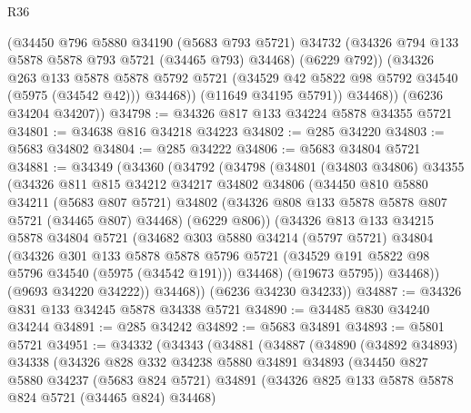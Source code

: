 \begin{lexlean}{R36}
\begin{coremodule}
              (@34450
                @796
                @5880
                @34190
                (@5683 @793 @5721)
                @34732
                (@34326 @794 @133 @5878 @5878 @793 @5721 (@34465 @793) @34468)
                (@6229 @792))
              (@34326
                @263
                @133
                @5878
                @5878
                @5792
                @5721
                (@34529 @42 @5822 @98 @5792 @34540 (@5975 (@34542 @42)))
                @34468))
            (@11649 @34195 @5791))
          @34468))
      (@6236 @34204 @34207))
@34798 := @34326 @817 @133 @34224 @5878 @34355 @5721
@34801 := @34638 @816 @34218 @34223
@34802 := @285 @34220
@34803 := @5683 @34802
@34804 := @285 @34222
@34806 := @5683 @34804 @5721
@34881 := @34349
    (@34360
      (@34792
        (@34798
          (@34801
            (@34803 @34806)
            @34355
            (@34326
              @811
              @815
              @34212
              @34217
              @34802
              @34806
              (@34450
                @810
                @5880
                @34211
                (@5683 @807 @5721)
                @34802
                (@34326 @808 @133 @5878 @5878 @807 @5721 (@34465 @807) @34468)
                (@6229 @806))
              (@34326
                @813
                @133
                @34215
                @5878
                @34804
                @5721
                (@34682
                  @303
                  @5880
                  @34214
                  (@5797 @5721)
                  @34804
                  (@34326
                    @301
                    @133
                    @5878
                    @5878
                    @5796
                    @5721
                    (@34529 @191 @5822 @98 @5796 @34540 (@5975 (@34542 @191)))
                    @34468)
                  (@19673 @5795))
                @34468))
            (@9693 @34220 @34222))
          @34468))
      (@6236 @34230 @34233))
@34887 := @34326 @831 @133 @34245 @5878 @34338 @5721
@34890 := @34485 @830 @34240 @34244
@34891 := @285 @34242
@34892 := @5683 @34891
@34893 := @5801 @5721
@34951 := @34332
    (@34343
      (@34881
        (@34887
          (@34890
            (@34892 @34893)
            @34338
            (@34326
              @828
              @332
              @34238
              @5880
              @34891
              @34893
              (@34450
                @827
                @5880
                @34237
                (@5683 @824 @5721)
                @34891
                (@34326 @825 @133 @5878 @5878 @824 @5721 (@34465 @824) @34468)

\end{coremodule}
\end{lexlean}
